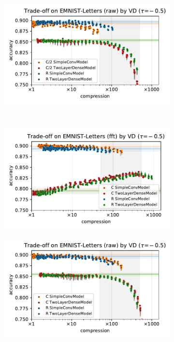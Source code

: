 \documentclass[a4paper,10pt,onecolumn]{article}
\begin{document}
\begin{figure}[b]
\begin{subfigure}[b]{0.5\columnwidth}
  \end{subfigure}%
  \begin{subfigure}[b]{0.5\columnwidth}
    \centering
    \includegraphics[width=\columnwidth]{figure__mnist-like__trade-off/appendix__cmp__VD__emnist_letters__raw__-0.5.pdf}
  \end{subfigure} \\ %
  \begin{subfigure}[b]{0.5\columnwidth}
    \centering
    \includegraphics[width=\columnwidth]{figure__mnist-like__trade-off/appendix__VD__emnist_letters__fft__-0.5.pdf}
  \end{subfigure}%
  \begin{subfigure}[b]{0.5\columnwidth}
    \centering
    \includegraphics[width=\columnwidth]{figure__mnist-like__trade-off/appendix__VD__emnist_letters__raw__-0.5.pdf}

\end{subfigure}
\end{figure}
\end{document}
